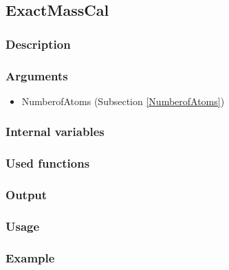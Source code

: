 \subsection{ExactMassCal}\label{ExactMassCal}
\subsubsection{Description}


\subsubsection{Arguments}

\begin{itemize}
\item NumberofAtoms (Subsection \ref{NumberofAtoms})
\end{itemize}
\subsubsection{Internal variables}
\subsubsection{Used functions}
\subsubsection{Output}
\subsubsection{Usage}
\subsubsection{Example}



